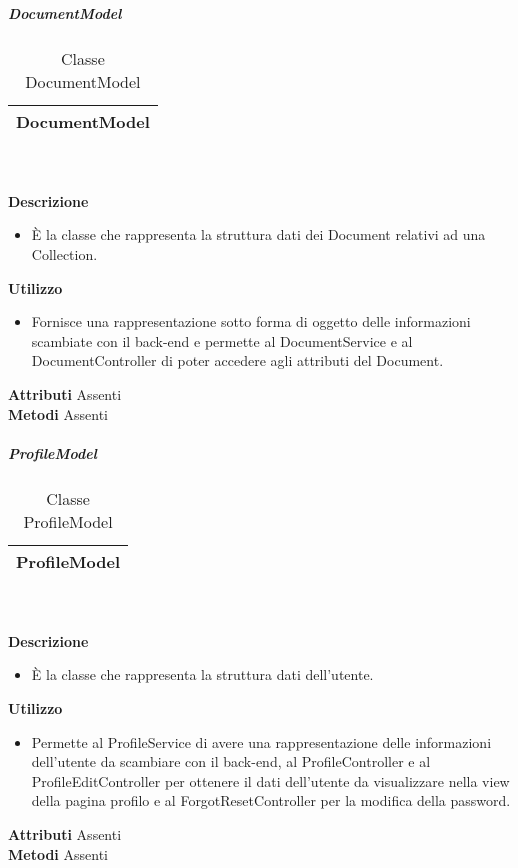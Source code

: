 			\subparagraph{DocumentModel} 
\begin{table}[ht]
\begin{center}
\bgroup
	\setlength{\arrayrulewidth}{0.6mm}
	\def\arraystretch{1}
		\begin{tabular}{ | p{12cm} | }
				\hline  
					\centerline{\textbf{DocumentModel}}
		\\ \hline 
				\hline
				\hline
		
		\end{tabular}
\egroup
\caption{Classe DocumentModel}
\end{center}
\end{table} \textbf{\\ \\ Descrizione}
\begin{itemize}
\item[] È la classe che rappresenta la struttura dati dei Document relativi ad una Collection.
\end{itemize} 
\textbf{Utilizzo}
\begin{itemize}
\item[] Fornisce una rappresentazione sotto forma di oggetto delle informazioni scambiate con il back-end e permette al DocumentService e al DocumentController di poter accedere agli attributi del Document.
\end{itemize}
\textbf{Attributi}
Assenti \\
\textbf{Metodi}
Assenti \\

			\subparagraph{ProfileModel} 
\begin{table}[ht]
\begin{center}
\bgroup
	\setlength{\arrayrulewidth}{0.6mm}
	\def\arraystretch{1}
		\begin{tabular}{ | p{12cm} | }
				\hline  
					\centerline{\textbf{ProfileModel}}
		\\ \hline 
				\hline
				\hline
		
		\end{tabular}
\egroup
\caption{Classe ProfileModel}
\end{center}
\end{table} \textbf{\\ \\ Descrizione}
\begin{itemize}
\item[] È la classe che rappresenta la struttura dati dell'utente.
\end{itemize} 
\textbf{Utilizzo}
\begin{itemize}
\item[] Permette al ProfileService di avere una rappresentazione delle informazioni dell'utente da scambiare con il back-end, al ProfileController e al ProfileEditController per ottenere il dati dell'utente da visualizzare nella view della pagina profilo e al ForgotResetController per la modifica della password.
\end{itemize}
\textbf{Attributi}
Assenti \\
\textbf{Metodi}
Assenti \\

